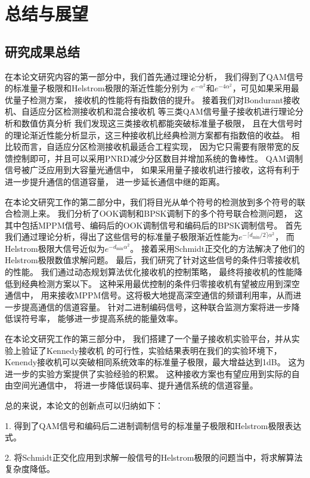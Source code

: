 \chapter{总结与展望}
\section{研究成果总结}
在本论文研究内容的第一部分中，我们首先通过理论分析，
我们得到了QAM信号的标准量子极限和Helstrom极限的渐近性能分别为
$e^{-\alpha^2}$和$e^{-4\alpha^2}$，可见如果采用最优量子检测方案，
接收机的性能将有指数倍的提升。
接着我们对Bondurant接收机、自适应分区检测接收机和混合接收机
等三类QAM信号量子接收机进行理论分析和数值仿真分析
我们发现这三类接收机都能突破标准量子极限，
且在大信号时的理论渐近性能分析显示，这三种接收机比经典检测方案都有指数倍的收益。
相比较而言，自适应分区检测接收机最适合工程实现，
因为它只需要有限带宽的反馈控制即可，并且可以采用PNRD减少分区数目并增加系统的鲁棒性。
QAM调制信号被广泛应用到大容量光通信中，
如果采用量子接收机进行接收，这将有利于进一步提升通信的信道容量，
进一步延长通信中继的距离。

在本论文研究工作的第二部分中，我们将目光从单个符号的检测放到多个符号的联合检测上来。
我们分析了OOK调制和BPSK调制下的多个符号联合检测问题，
这其中包括MPPM信号、编码后的OOK调制信号和编码后的BPSK调制信号。
首先我们通过理论分析，得出了这些信号的标准量子极限渐近性能为$e^{-\lceil d_{\min}/2\rceil \alpha^2}$，
而Helstrom极限大信号近似为$e^{-d_{\min} \alpha^2}$。
接着采用Schmidt正交化的方法解决了他们的Helstrom极限数值求解问题。
最后，我们研究了针对这些信号的条件归零接收机的性能。
我们通过动态规划算法优化接收机的控制策略，
最终将接收机的性能降低到经典检测方案以下。
这种采用最优控制的条件归零接收机有望被应用到深空通信中，
用来接收MPPM信号。这将极大地提高深空通信的频谱利用率，从而进一步提高通信的信道容量。
针对二进制编码信号，这种联合监测方案将进一步降低误符号率，
能够进一步提高系统的能量效率。

在本论文研究工作的第三部分中，
我们搭建了一个量子接收机实验平台，并从实验上验证了Kennedy接收机
的可行性，实验结果表明在我们的实验环境下，
Kenendy接收机可以突破相同系统效率的标准量子极限，最大增益达到1dB。
这为进一步的实验方案提供了实验经验的积累。
这种接收方案也有望应用到实际的自由空间光通信中，
将进一步降低误码率、提升通信系统的信道容量。

总的来说，本论文的创新点可以归纳如下：

1. 得到了QAM信号和编码后二进制调制信号的标准量子极限和Helstrom极限表达式。

2. 将Schmidt正交化应用到求解一般信号的Helstrom极限的问题当中，将求解算法复杂度降低。

